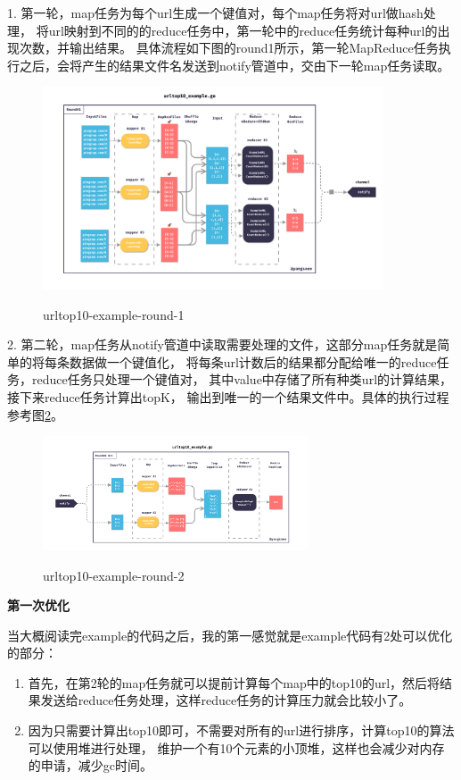 \documentclass[UTF8]{ctexart}
\begin{document}
1. 第一轮，map任务为每个url生成一个键值对，每个map任务将对url做hash处理，
将url映射到不同的的reduce任务中，第一轮中的reduce任务统计每种url的出现次数，并输出结果。
具体流程如下图的round1所示，第一轮MapReduce任务执行之后，会将产生的结果文件名发送到notify管道中，交由下一轮map任务读取。
 \begin{figure}[H]
  \centering
  \includegraphics[width=0.9\textwidth]{fig/mr-example-1.pdf}\\
  \caption{urltop10-example-round-1}
  \label{mre1}
\end{figure}
2. 第二轮，map任务从notify管道中读取需要处理的文件，这部分map任务就是简单的将每条数据做一个键值化，
将每条url计数后的结果都分配给唯一的reduce任务，reduce任务只处理一个键值对，
其中value中存储了所有种类url的计算结果，接下来reduce任务计算出topK，
输出到唯一的一个结果文件中。具体的执行过程参考图\ref{mre2}。
\begin{figure}[H]
  \centering
  \includegraphics[width=0.7\textwidth]{fig/mr-example-2.pdf}\\
  \caption{urltop10-example-round-2}
  \label{mre2}
\end{figure}

\textbf{第一次优化}

当大概阅读完example的代码之后，我的第一感觉就是example代码有2处可以优化的部分：
\begin{enumerate}
  \item 首先，在第2轮的map任务就可以提前计算每个map中的top10的url，然后将结果发送给reduce任务处理，这样reduce任务的计算压力就会比较小了。
  \item 因为只需要计算出top10即可，不需要对所有的url进行排序，计算top10的算法可以使用堆进行处理，
        维护一个有10个元素的小顶堆，这样也会减少对内存的申请，减少gc时间。
\end{enumerate}
\end{document}
